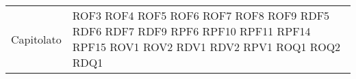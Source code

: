 \begin{longtable}{| p{5cm} | p{5cm} |}
		\rowcolor{LightGray}
		Capitolato & ROF3 \newline
					ROF4 \newline
					ROF5 \newline
					ROF6 \newline
					ROF7 \newline
					ROF8 \newline
					ROF9 \newline
					RDF5 \newline
					RDF6 \newline
					RDF7 \newline
					RDF9 \newline
					RPF6 \newline
					RPF10 \newline
					RPF11 \newline
					RPF14 \newline
					RPF15 \newline
					ROV1 \newline
					ROV2 \newline
					RDV1 \newline
					RDV2 \newline
					RPV1 \newline
					ROQ1 \newline
					ROQ2\newline
					RDQ1\newline	
		 \\
		

\end{longtable}
